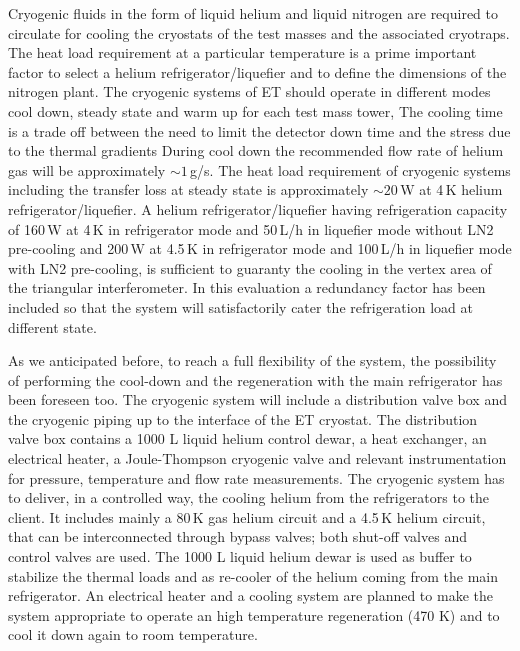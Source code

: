 Cryogenic  fluids in the form of liquid helium and liquid nitrogen are required to circulate for cooling the cryostats of the test masses and the associated cryotraps. 
The heat load requirement at a particular temperature is a prime important factor to select a helium refrigerator/liquefier and to define the dimensions of the nitrogen plant. The cryogenic systems of ET should operate in different modes cool down, steady state and warm up for each test mass tower,
 The cooling time  is a trade off between the need to limit the detector down  time and the  stress due to the thermal gradients 
 During cool down the recommended  flow rate of helium gas will be approximately  $\sim 1$\,g/s. 
 The heat load requirement of cryogenic systems including the transfer loss at steady state is approximately $\sim 20$\,W at 4\,K helium refrigerator/liquefier. A helium refrigerator/liquefier having refrigeration capacity of 160\,W at 4\,K in refrigerator mode and 50\,L/h in liquefier mode without LN2 pre-cooling and 200\,W at 4.5\,K in refrigerator mode and 100\,L/h in liquefier mode with LN2 pre-cooling, is sufficient to guaranty the cooling in the vertex area of the triangular interferometer. In this evaluation a redundancy factor has been included so that  the system will satisfactorily cater the refrigeration load at different state.

 As we anticipated before, to reach a full flexibility of the system, the possibility of performing the cool-down and the regeneration with the main refrigerator has been foreseen too.
The  cryogenic system  will include a distribution valve box and the cryogenic piping up to the interface of the ET cryostat. The distribution valve box contains a 1000 L liquid helium control dewar, a heat exchanger, an electrical heater, a Joule-Thompson cryogenic valve and relevant instrumentation for pressure, temperature and flow rate measurements.
The cryogenic system  has to deliver, in a controlled way, the cooling helium from the refrigerators to the client. It includes mainly a 80\,K gas helium circuit and a 4.5\,K  helium circuit, that can be interconnected through bypass valves; both shut-off valves and control valves are used. The 1000 L liquid helium dewar is used as buffer to stabilize the thermal loads and as re-cooler of the  helium coming from the main refrigerator.  An electrical heater and a cooling system are planned to make the system appropriate to operate an high temperature regeneration (470 K) and to cool it down again to room temperature.

